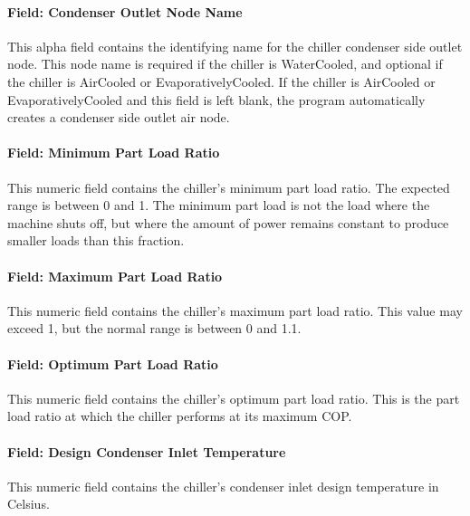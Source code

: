 \paragraph{Field: Condenser Outlet Node Name}\label{field-condenser-outlet-node-name-5}

This alpha field contains the identifying name for the chiller condenser side outlet node. This node name is required if the chiller is WaterCooled, and optional if the chiller is AirCooled or EvaporativelyCooled. If the chiller is AirCooled or EvaporativelyCooled and this field is left blank, the program automatically creates a condenser side outlet air node.

\paragraph{Field: Minimum Part Load Ratio}\label{field-minimum-part-load-ratio-5}

This numeric field contains the chiller's minimum part load ratio. The expected range is between 0 and 1. The minimum part load is not the load where the machine shuts off, but where the amount of power remains constant to produce smaller loads than this fraction.

\paragraph{Field: Maximum Part Load Ratio}\label{field-maximum-part-load-ratio-5}

This numeric field contains the chiller's maximum part load ratio. This value may exceed 1, but the normal range is between 0 and 1.1.

\paragraph{Field: Optimum Part Load Ratio}\label{field-optimum-part-load-ratio-5}

This numeric field contains the chiller's optimum part load ratio. This is the part load ratio at which the chiller performs at its maximum COP.

\paragraph{Field: Design Condenser Inlet Temperature}\label{field-design-condenser-inlet-temperature-3}

This numeric field contains the chiller's condenser inlet design temperature in Celsius.

